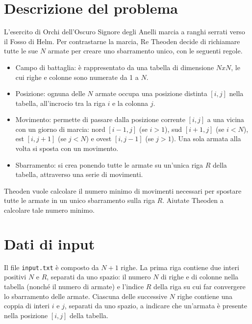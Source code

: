 \documentclass[a4paper,11pt]{article}
\begin{document}
\vspace{0.5cm}



\vspace{0.5cm}

\section*{Descrizione del problema}
  
L'esercito di Orchi dell'Oscuro Signore degli Anelli marcia a ranghi
serrati verso il Fosso di Helm.  Per contrastarne la marcia, Re
Theoden decide di richiamare tutte le sue $N$ armate per
creare uno sbarramento unico, con le seguenti regole.

\begin{itemize}
  
    \item 
Campo di battaglia: è rappresentato da una tabella di
dimensione $NxN$, le cui righe e colonne sono numerate da 1 a
$N$.

    \item 
Posizione: ognuna delle $N$ armate occupa una posizione
distinta $[i,j]$
nella tabella, all'incrocio tra la riga $i$ e la
colonna $j$.

    \item 
Movimento: permette di passare dalla posizione corrente
$[i,j]$ a una vicina con un giorno di marcia: nord
$[i-1,j]$ (se $i > 1$), sud $[i+1,j]$
(se $i < N$), est $[i,j+1]$ (se $j <
N$) e ovest $[i,j-1]$ (se $j > 1$). 
Una sola armata alla volta si sposta con un movimento.

    \item 
Sbarramento: si crea ponendo tutte le armate su un'unica
riga $R$ della tabella, attraverso una serie di
movimenti. 

\end{itemize}


Theoden vuole calcolare il numero minimo di movimenti necessari per
spostare tutte le armate in un unico sbarramento sulla riga
$R$.  Aiutate Theoden a calcolare tale numero minimo.


\section*{Dati di input}
  
Il file \texttt{input.txt} è composto da $N+1$
righe.  La prima riga contiene due interi positivi $N$
e $R$, separati da uno spazio: il numero $N$ di
righe e di colonne nella tabella (nonché il numero di armate) e
l'indice $R$ della riga su cui far convergere lo sbarramento
delle armate.  Ciascuna delle successive $N$ righe contiene
una coppia di interi $i$ e $j$, separati da uno
spazio, a indicare che un'armata è presente nella
posizione $[i,j]$ della tabella.
\end{document}
